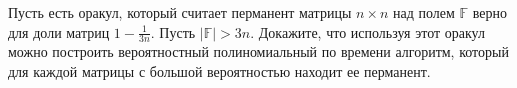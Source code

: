 Пусть есть оракул, который считает перманент матрицы $n \times n$ над полем $\mathbb{F}$ верно для доли матриц
$1 - \frac{1}{3n}$. Пусть $|\mathbb{F}| > 3n$. Докажите, что используя этот оракул можно построить вероятностный
полиномиальный по времени алгоритм, который для каждой матрицы с большой вероятностью находит ее перманент.
